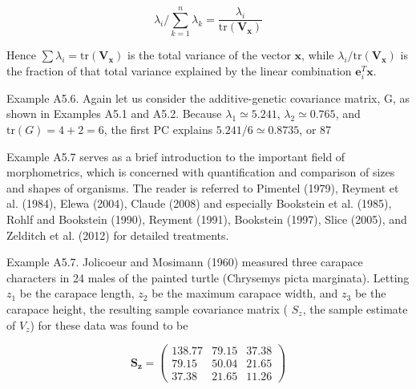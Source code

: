\documentclass{article}
\begin{document}
\begin{equation}
\lambda_{i}\bigg/\sum_{k=1}^{n}\lambda_{k}=\frac{\lambda_{i}}{\mathrm{tr}(\mathbf{V_{x}})}
\end{equation}

Hence  $ \sum \lambda_i = \text{tr}(\mathbf{V}_\mathbf{x}) $ is the total variance of the vector  $ \mathbf{x} $, while  $ \lambda_i/\text{tr}(\mathbf{V}_\mathbf{x}) $ is the fraction of that total variance explained by the linear combination  $ \mathbf{e}_i^T \mathbf{x} $.

Example A5.6. Again let us consider the additive-genetic covariance matrix, G, as shown in Examples A5.1 and A5.2. Because  $ \lambda_1 \simeq 5.241 $,  $ \lambda_2 \simeq 0.765 $, and  $ \text{tr}(G) = 4 + 2 = 6 $, the first PC explains  $ 5.241/6 \simeq 0.8735 $, or 87%

Example A5.7 serves as a brief introduction to the important field of morphometrics, which is concerned with quantification and comparison of sizes and shapes of organisms. The reader is referred to Pimentel (1979), Reyment et al. (1984), Elewa (2004), Claude (2008) and especially Bookstein et al. (1985), Rohlf and Bookstein (1990), Reyment (1991), Bookstein (1997), Slice (2005), and Zelditch et al. (2012) for detailed treatments.

Example A5.7. Jolicoeur and Mosimann (1960) measured three carapace characters in 24 males of the painted turtle (Chrysemys picta marginata). Letting  $ z_1 $ be the carapace length,  $ z_2 $ be the maximum carapace width, and  $ z_3 $ be the carapace height, the resulting sample covariance matrix ( $ S_z $, the sample estimate of  $ V_z $) for these data was found to be

\begin{equation}
\mathbf{S}_{\mathbf{z}}=\begin{pmatrix}138.77&79.15&37.38\\79.15&50.04&21.65\\37.38&21.65&11.26\end{pmatrix}
\end{equation}
\end{document}
